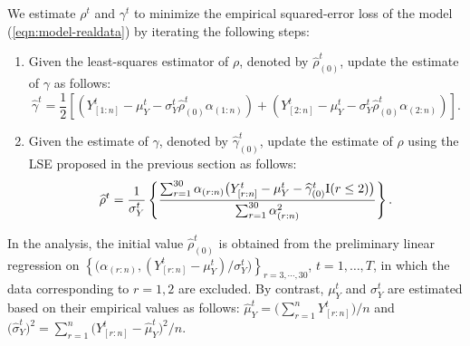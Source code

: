 \documentclass[12pt]{article}
\begin{document}
We estimate $\rho^t$ and $\gamma^t$ to minimize the empirical squared-error loss of the 
model (\ref{eqn:model-realdata}) by iterating the following steps:
\begin{enumerate} 
\item Given the least-squares estimator of $\rho$, denoted by $\widehat{\rho}_{(0)}^t$, update 
the estimate of $\gamma$ as follows: 
\begin{equation} \nonumber 
\widehat{\gamma}^t = \frac{1}{2} \left[
	\left( Y_{[1:n]}^t - \mu_Y^t - \sigma_Y^t \widehat{\rho}_{(0)}^t \alpha_{(1:n)} \right) +
	\left( Y_{[2:n]}^t - \mu_Y^t - \sigma_Y^t \widehat{\rho}_{(0)}^t \alpha_{(2:n)} \right)
	\right].
\end{equation} 
\item Given the estimate of $\gamma$, denoted by $\widehat{\gamma}_{(0)}^t$, update the estimate
of $\rho$ using the LSE proposed in the previous section as follows: 
\begin{equation} \nonumber 
\widehat{\rho}^t = \frac{1}{\sigma_Y^t} \left\{
	\frac{\sum_{r=1}^{30} \alpha_{(r:n)}
\big(Y_{[r:n]}^t - \mu_Y^t - \widehat{\gamma}_{(0)}^t {\rm I} (r \le 2) \big) }
{\sum_{r=1}^{30} \alpha_{(r:n)}^2 } \right\}.
\end{equation} 
\end{enumerate} 
In the analysis, the initial value $\widehat{\rho}_{(0)}^t$ is obtained from the preliminary linear regression on  $\left\{ \big( \alpha_{(r:n)}, (Y_{[r:n]}^t - \mu_Y^t)/\sigma_Y^t \big) \right\}_{r=3, \cdots, 30}$, $t=1,\ldots, T$, in which the data corresponding to $r=1,2$ are excluded.  By contrast, $\mu_Y^t$ and $\sigma_Y^t$ are 
estimated based on their empirical values as follows:
 $\widehat{\mu}_Y^t = \big(\sum_{r=1}^{n} Y_{[r:n]}^t\big) \big/n$ and 
$\big(\widehat{\sigma}_Y^t)^2 = \sum_{r=1}^{n} \big( Y_{[r:n]}^t - \widehat{\mu}_Y^t \big)^2 \big/n$.
\end{document}
